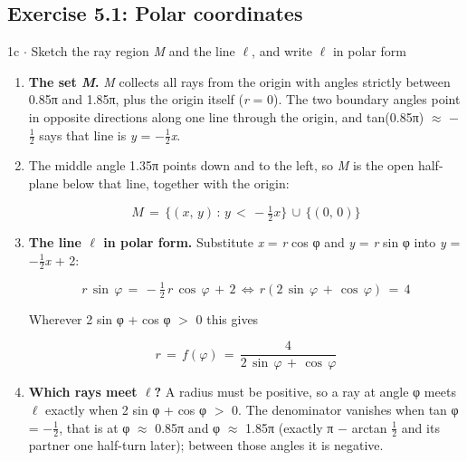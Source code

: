 \documentclass[11pt]{article}
\begin{document}
\begin{keepsection}\subsection{Exercise 5.1: Polar coordinates}

\begin{workedbox}{1c \ensuremath{\cdot} Sketch the ray region \textit{M} and the line \ensuremath{\ell}, and write \ensuremath{\ell} in polar form}
\begin{enumerate}
\item \textbf{The set \textit{M}.} \textit{M} collects all rays from the origin with angles strictly between 0.85π and 1.85π, plus the origin itself (\textit{r} = 0). The two boundary angles point in opposite directions along one line through the origin, and tan(0.85π) \ensuremath{\approx} \ensuremath{-}\ensuremath{\tfrac12} says that line is \textit{y} = \ensuremath{-}\ensuremath{\tfrac12}\textit{x}.
\item {}
The middle angle 1.35π points down and to the left, so \textit{M} is the open half-plane below that line, together with the origin:

\begin{equation*}{M}\, =\, \{({x},\, {y})\, :\, {y}\, <\, -\tfrac{1}{2}{x}\}\, \cup \, \{(0,\, 0)\}\end{equation*}
\item {}
\textbf{The line \ensuremath{\ell} in polar form.} Substitute \textit{x} = \textit{r} cos φ and \textit{y} = \textit{r} sin φ into \textit{y} = \ensuremath{-}\ensuremath{\tfrac12}\textit{x} + 2:

\begin{equation*}{r}\, \sin \, φ\, =\, -\tfrac{1}{2}\, {r}\, \cos \, φ\, +\, 2\, \Leftrightarrow \, {r}(2\, \sin \, φ\, +\, \cos \, φ)\, =\, 4\end{equation*}

Wherever 2 sin φ + cos φ \ensuremath{>} 0 this gives

\begin{equation*}{r}\, =\, {f}(φ)\, =\, \dfrac{4}{2\, \sin \, φ\, +\, \cos \, φ}\end{equation*}
\item {}
\textbf{Which rays meet \ensuremath{\ell}?} A radius must be positive, so a ray at angle φ meets \ensuremath{\ell} exactly when 2 sin φ + cos φ \ensuremath{>} 0. The denominator vanishes when tan φ = \ensuremath{-}\ensuremath{\tfrac12}, that is at φ \ensuremath{\approx} 0.85π and φ \ensuremath{\approx} 1.85π (exactly π \ensuremath{-} arctan \ensuremath{\tfrac12} and its partner one half-turn later); between those angles it is negative.


\end{enumerate}
\end{workedbox}
\end{keepsection}
\end{document}
